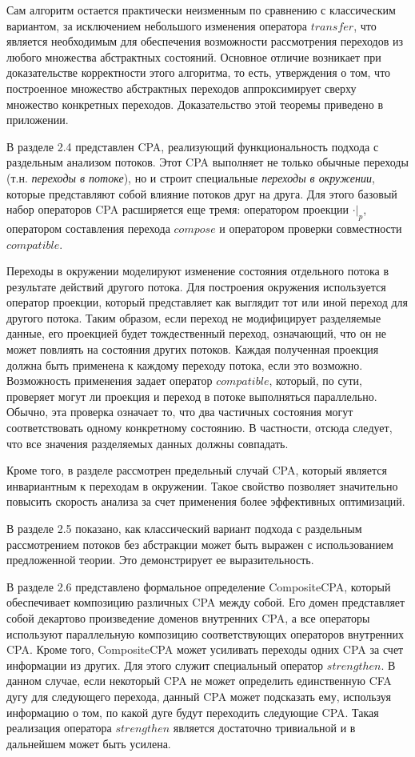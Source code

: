 Сам алгоритм остается практически неизменным по сравнению с классическим вариантом, за исключением небольшого изменения оператора $transfer$, что является необходимым для обеспечения возможности рассмотрения переходов из любого множества абстрактных состояний. 
Основное отличие возникает при доказательстве корректности этого алгоритма, то есть, утверждения о том, что построенное множество абстрактных переходов аппроксимирует сверху множество конкретных переходов.
Доказательство этой теоремы приведено в приложении.
 
В разделе 2.4 представлен CPA, реализующий функциональность подхода с раздельным анализом потоков.
Этот CPA выполняет не только обычные переходы (т.н. \textit{переходы в потоке}), но и строит специальные \textit{переходы в окружении}, которые представляют собой влияние потоков друг на друга.
Для этого базовый набор операторов CPA расширяется еще тремя: оператором проекции $\cdot|_p$, оператором составления перехода $compose$ и оператором проверки совместности $compatible$.

Переходы в окружении моделируют изменение состояния отдельного потока в результате действий другого потока.
Для построения окружения используется оператор проекции, который представляет как выглядит тот или иной переход для другого потока.
Таким образом, если переход не модифицирует разделяемые данные, его проекцией будет тождественный переход, означающий, что он не может повлиять на состояния других потоков.
Каждая полученная проекция должна быть применена к каждому переходу потока, если это возможно.
Возможность применения задает оператор $compatible$, который, по сути, проверяет могут ли проекция и переход в потоке выполняться параллельно. 
Обычно, эта проверка означает то, что два частичных состояния могут соответствовать одному конкретному состоянию.
В частности, отсюда следует, что все значения разделяемых данных должны совпадать.

Кроме того, в разделе рассмотрен предельный случай CPA, который является инвариантным к переходам в окружении.
Такое свойство позволяет значительно повысить скорость анализа за счет применения более эффективных оптимизаций.

В разделе 2.5 показано, как классический вариант подхода с раздельным рассмотрением потоков без абстракции может быть выражен с использованием предложенной теории. 
Это демонстрирует ее выразительность.

В разделе 2.6 представлено формальное определение CompositeCPA, который обеспечивает композицию различных CPA между собой.
Его домен представляет собой декартово произведение доменов внутренних CPA, а все операторы используют параллельную композицию соответствующих операторов внутренних CPA.
Кроме того, CompositeCPA может усиливать переходы одних CPA за счет информации из других.
Для этого служит специальный оператор $strengthen$.
В данном случае, если некоторый CPA не может определить единственную CFA дугу для следующего перехода, данный CPA может подсказать ему, используя информацию о том, по какой дуге будут переходить следующие CPA.
Такая реализация оператора $strengthen$ является достаточно тривиальной и в дальнейшем может быть усилена.

